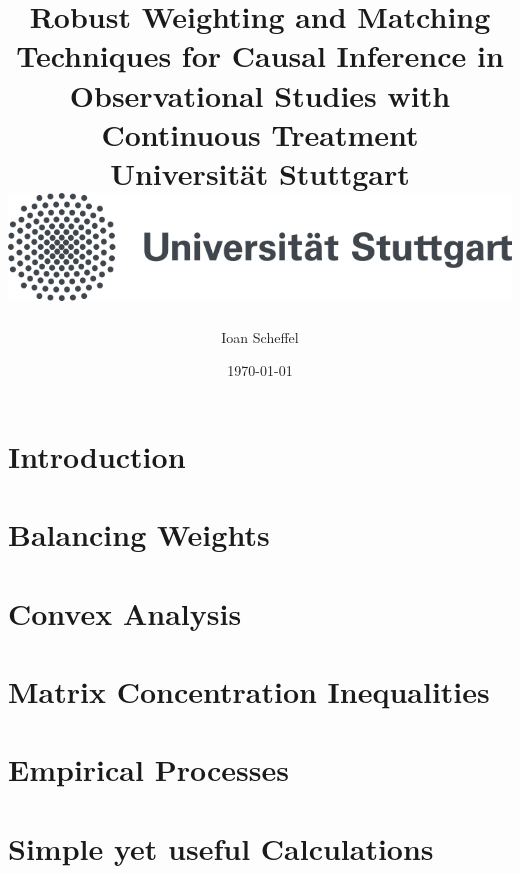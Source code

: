 \documentclass[12pt]{scrreport}
\title{
  {
    Robust Weighting and Matching Techniques for Causal Inference in Observational Studies with Continuous Treatment
  }
  \\
  {\large Universität Stuttgart}
  \\
  {\includegraphics{unistuttgart_logo_deutsch.jpg}}
}
\author{Ioan Scheffel}
\date{\today}
\begin{document}
\maketitle

\tableofcontents 

\chapter{Introduction}


\chapter{Balancing Weights}


\chapter{Convex Analysis}


\chapter{Matrix Concentration Inequalities}


\chapter{Empirical Processes}


\chapter{Simple yet useful Calculations}




{}

\end{document}
